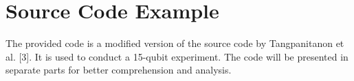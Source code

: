 \chapter{Source Code Example}\label{ch4:code}
The provided code is a modified version of the source code by Tangpanitanon et al. [3]. It is used to conduct a 15-qubit experiment. The code will be presented in separate parts for better comprehension and analysis.
